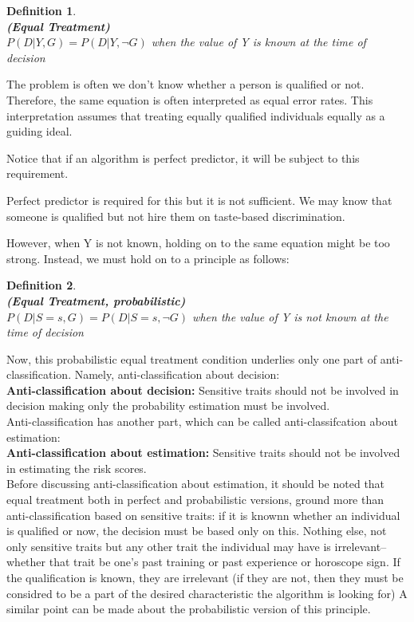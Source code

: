 \documentclass{article}
\newtheorem{definition}{Definition}
\begin{document}
\begin{definition} \\
  \textup{ \textbf{(Equal Treatment)}}  \\
$ P(D|Y, G) =  P(D|Y, \neg G)$ \textup{when the value of Y is known at the time of decision}
\end{definition}

The problem is often we don't know whether a person is qualified or not. Therefore, the same equation is often interpreted as equal error rates. This interpretation assumes that treating equally qualified individuals equally as a guiding ideal. 

Notice that if an algorithm is perfect predictor, it will be subject to this requirement.  

Perfect predictor is required for this but it is not sufficient. We may know that someone is qualified but not hire them on taste-based discrimination. 

However, when Y is not known, holding on to the same equation might be too strong. Instead, we must hold on to a principle as follows: 

\begin{definition} \\
  \textup{ \textbf{(Equal Treatment, probabilistic)}}  \\
$ P(D|S=s, G) =  P(D|S=s, \neg G)$ \textup{when the value of Y is not known at the time of decision}
\end{definition}

Now, this probabilistic equal treatment condition underlies only one part of anti-classification. Namely, anti-classification about decision: \\


\textbf{Anti-classification about decision:} Sensitive traits should not be involved in decision making only the probability estimation must be involved. \\

Anti-classification has another part, which can be called anti-classifcation about estimation: \\

\textbf{Anti-classification about estimation:} Sensitive traits should not be involved in estimating the risk scores. \\

Before discussing anti-classification about estimation, it should be noted that equal treatment both in perfect and probabilistic versions, ground more than anti-classification based on sensitive traits: if it is knownn whether an individual is qualified or now, the decision must be based only on this. Nothing else, not only sensitive traits but any other trait the individual may have is irrelevant-- whether that trait be one's past training or past experience or horoscope sign. If the qualification is known, they are irrelevant (if they are not, then they must be considred to be a part of the desired characteristic the algorithm is looking for) A similar point can be made about the probabilistic version of this principle.
\end{document}
